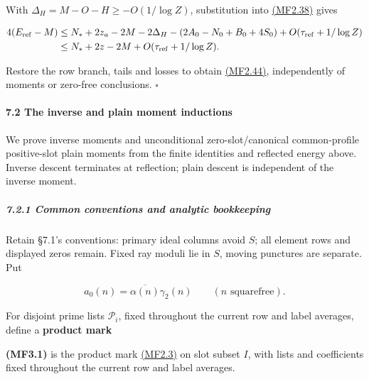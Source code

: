 With \(\Delta_H=M-O-H\ge-O(1/\log Z)\), substitution into \protect\hyperlink{mf:eq:B2.38}{(MF2.38)} gives

\[
\begin{aligned}
4(E_{\rm ref}-M)
&\le N_*+2z_a-2M-2\Delta_H
-(2A_0-N_0+B_0+4S_0)+O(\tau_{\rm ref}+1/\log Z)\\
&\le N_*+2z-2M+O(\tau_{\rm ref}+1/\log Z).
\end{aligned}
\]

Restore the row branch, tails and losses to obtain \protect\hyperlink{mf:eq:B2.44}{(MF2.44)}, independently of moments or zero-free conclusions. \(\square\)

\hypertarget{the-inverse-and-plain-moment-inductions}{}

\label{the-inverse-and-plain-moment-inductions}

\hypertarget{the-inverse-and-plain-moment-inductions-heading-2}{%
\paragraph{7.2 The inverse and plain moment inductions}}

We prove inverse moments and unconditional zero-slot/canonical common-profile positive-slot plain moments from the finite identities and reflected energy above. Inverse descent terminates at reflection; plain descent is independent of the inverse moment.

\hypertarget{common-conventions-and-analytic-bookkeeping}{}

\label{common-conventions-and-analytic-bookkeeping}

\hypertarget{common-conventions-and-analytic-bookkeeping-heading-2}{%
\subparagraph{7.2.1 Common conventions and analytic bookkeeping}}

Retain §7.1's conventions: primary ideal columns avoid \(S\); all element rows and displayed zeros remain. Fixed ray moduli lie in \(S\), moving punctures are separate. Put

\[
a_0(n)=\overline{\alpha(n)}\gamma_2(n)\qquad(n\text{ squarefree}).
\]

For disjoint prime lists \(\mathcal P_i\), fixed throughout the current row and label averages, define a \textbf{product mark}

\hypertarget{mf:eq:B3.1}{}

\label{mf:eq:B3.1}

\textbf{(MF3.1)} is the product mark \protect\hyperlink{mf:eq:B2.3}{(MF2.3)} on slot subset \(I\), with lists and coefficients fixed throughout the current row and label averages.

